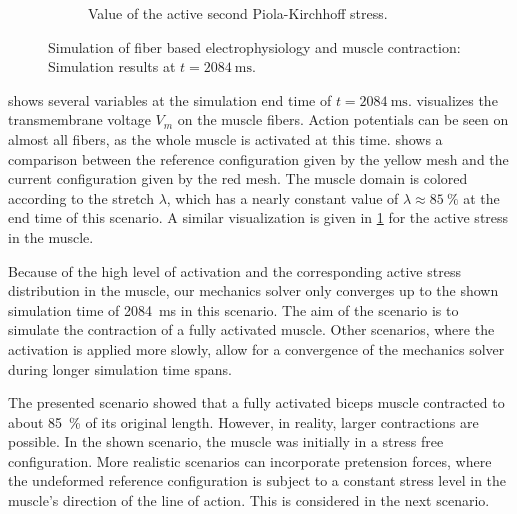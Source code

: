 \begin{figure}
\begin{subfigure}[t]{0.31\textwidth}
    \caption{Value of the active second Piola-Kirchhoff stress.}%
    \label{fig:contraction_active_stress}%
  \end{subfigure}
  \caption{Simulation of fiber based electrophysiology and muscle contraction: Simulation results at $t=\SI{2084}{\ms}$.}%
  \label{fig:contraction_at_end}%
\end{figure}%

 shows several variables at the simulation end time of $t=\SI{2084}{\ms}$.  visualizes the transmembrane voltage $V_m$ on the muscle fibers. Action potentials can be seen on almost all fibers, as the whole muscle is activated at this time.  shows a comparison between the reference configuration given by the yellow mesh and the current configuration given by the red mesh. The muscle domain is colored according to the stretch $\lambda$, which has a nearly constant value of $\lambda \approx \SI{85}{\percent}$ at the end time of this scenario. A similar visualization is given in \cref{fig:contraction_active_stress} for the active stress in the muscle.

Because of the high level of activation and the corresponding active stress distribution in the muscle, our mechanics solver only converges up to the shown simulation time of \SI{2084}{\ms} in this scenario. The aim of the scenario is to simulate the contraction of a fully activated muscle. Other scenarios, where the activation is applied more slowly, allow for a convergence of the mechanics solver during longer simulation time spans.

The presented scenario showed that a fully activated biceps muscle contracted to about \SI{85}{\percent} of its original length. However, in reality, larger contractions are possible. In the shown scenario, the muscle was initially in a stress free configuration. More realistic scenarios can incorporate pretension forces, where the undeformed reference configuration is subject to a constant stress level in the muscle's direction of the line of action. This is considered in the next scenario.


